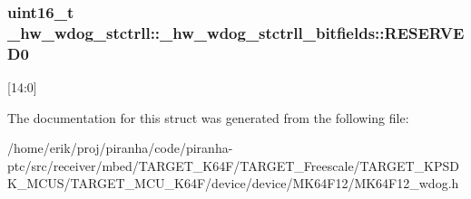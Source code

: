 \subsubsection[{\texorpdfstring{R\+E\+S\+E\+R\+V\+E\+D0}{RESERVED0}}]{\setlength{\rightskip}{0pt plus 5cm}uint16\+\_\+t \+\_\+hw\+\_\+wdog\+\_\+stctrll\+::\+\_\+hw\+\_\+wdog\+\_\+stctrll\+\_\+bitfields\+::\+R\+E\+S\+E\+R\+V\+E\+D0}\hypertarget{struct__hw__wdog__stctrll_1_1__hw__wdog__stctrll__bitfields_a155846fdaa4e4b9c72f1ea2337d37be8}{}\label{struct__hw__wdog__stctrll_1_1__hw__wdog__stctrll__bitfields_a155846fdaa4e4b9c72f1ea2337d37be8}
\mbox{[}14\+:0\mbox{]} 

The documentation for this struct was generated from the following file\+:\begin{DoxyCompactItemize}
\item 
/home/erik/proj/piranha/code/piranha-\/ptc/src/receiver/mbed/\+T\+A\+R\+G\+E\+T\+\_\+\+K64\+F/\+T\+A\+R\+G\+E\+T\+\_\+\+Freescale/\+T\+A\+R\+G\+E\+T\+\_\+\+K\+P\+S\+D\+K\+\_\+\+M\+C\+U\+S/\+T\+A\+R\+G\+E\+T\+\_\+\+M\+C\+U\+\_\+\+K64\+F/device/device/\+M\+K64\+F12/M\+K64\+F12\+\_\+wdog.\+h\end{DoxyCompactItemize}
